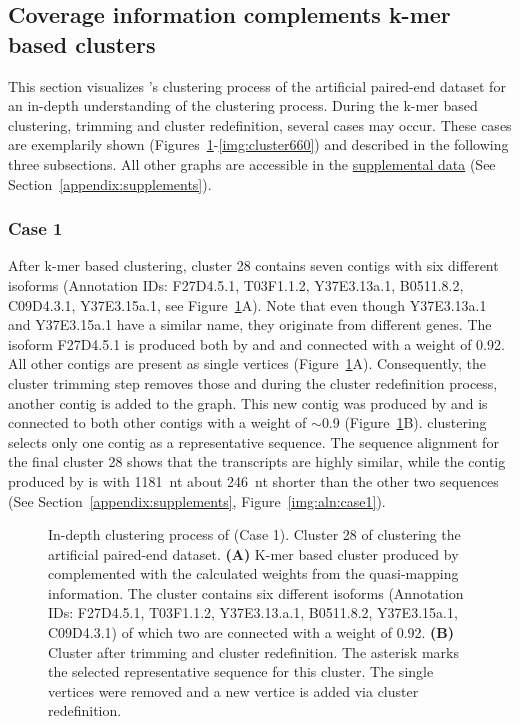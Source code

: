 \documentclass[12pt,a4paper,english]{article}
\begin{document}
	\subsection{Coverage information complements k-mer based clusters}
	\label{ssec:graphs}
	This section visualizes \karma{}'s clustering process of the artificial paired-end \celegans dataset for an in-depth understanding of the clustering process. During the k-mer based clustering, trimming and cluster redefinition, several cases may occur. These cases are exemplarily shown (Figures~\ref{img:cluster28}-\ref{img:cluster660}) and described in the following three subsections. All other graphs are accessible in the \href{https://github.com/lmfaber/master_thesis/tree/master/supplemental_data/graphs}{supplemental data} (See Section~\ref{appendix:supplements}).
	
	\subsubsection*{Case 1}
        After k-mer based clustering, cluster 28 contains seven contigs with six different isoforms (Annotation IDs: F27D4.5.1, T03F1.1.2, Y37E3.13a.1, B0511.8.2, C09D4.3.1, Y37E3.15a.1, see Figure~\ref{img:cluster28}A). 
        Note that even though Y37E3.13a.1 and Y37E3.15a.1 have a similar name, they originate from different genes. The isoform F27D4.5.1 is produced both by \spades and \trinity and connected with a weight of 0.92. All other contigs are present as single vertices (Figure~\ref{img:cluster28}A). Consequently, the cluster trimming step removes those and during the cluster redefinition process, another contig is added to the graph. This new contig was produced by \soap and is connected to both other contigs with a weight of $\sim$0.9 (Figure~\ref{img:cluster28}B). \mcl clustering selects only one contig as a representative sequence. 
        The sequence alignment for the final cluster 28 shows that the transcripts are highly similar, while the contig produced by \soap is with 1181~nt about 246~nt shorter than the other two sequences (See Section~\ref{appendix:supplements}, Figure~\ref{img:aln:case1}).

		\begin{figure}[H]
			\centering
			\def\svgwidth{\textwidth}
			
			\caption[In-depth clustering process of \karma (Case 1).]{In-depth clustering process of \karma (Case 1). Cluster 28 of clustering the artificial paired-end dataset. \textbf{(A)} K-mer based cluster produced by \hdbscan complemented with the calculated weights from the quasi-mapping information. The cluster contains six different isoforms (Annotation IDs: F27D4.5.1, T03F1.1.2, Y37E3.13.a.1, B0511.8.2, Y37E3.15a.1, C09D4.3.1) of which two are connected with a weight of 0.92. \textbf{(B)} Cluster after trimming and cluster redefinition. The asterisk marks the selected representative sequence for this cluster. The single vertices were removed and a new vertice is added via cluster redefinition.}
			\label{img:cluster28}
		\end{figure}
		
\end{document}
